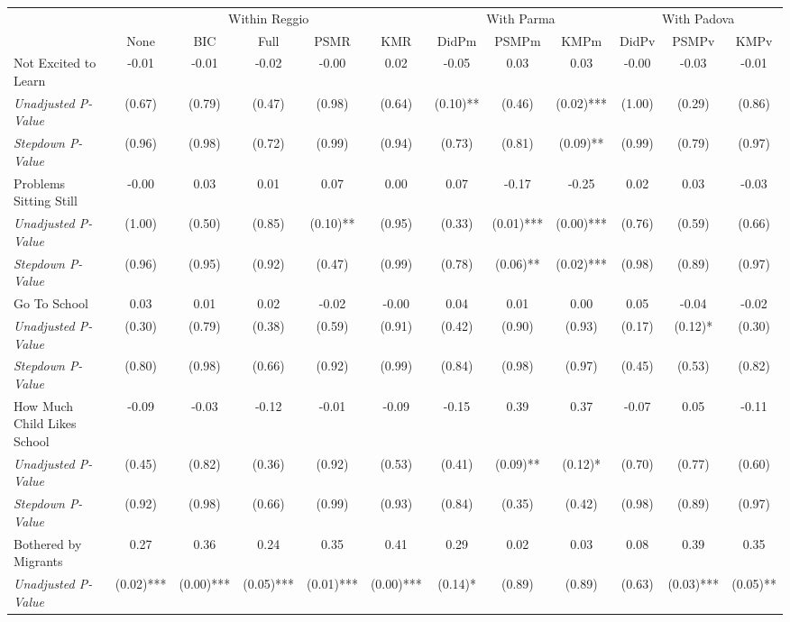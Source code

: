 \begin{tabular}{l c c c c c c c c c c c}
\toprule
& \multicolumn{5}{c}{Within Reggio} & \multicolumn{3}{c}{With Parma} & \multicolumn{3}{c}{With Padova} \\\cmidrule(lr){2-6} \cmidrule(lr){7-9} \cmidrule(lr){10-12}
 & None & BIC & Full & PSMR & KMR & DidPm & PSMPm & KMPm & DidPv & PSMPv & KMPv \\
\midrule
Not Excited to Learn & -0.01 & -0.01 & -0.02 & -0.00 & 0.02 & -0.05 & 0.03 & 0.03 & -0.00 & -0.03 & -0.01 \\
\quad \textit{Unadjusted P-Value} & (0.67) & (0.79) & (0.47) & (0.98) & (0.64) & (0.10)** & (0.46) & (0.02)*** & (1.00) & (0.29) & (0.86) \\
\quad \textit{Stepdown P-Value} & (0.96) & (0.98) & (0.72) & (0.99) & (0.94) & (0.73) & (0.81) & (0.09)** & (0.99) & (0.79) & (0.97) \\
Problems Sitting Still & -0.00 & 0.03 & 0.01 & 0.07 & 0.00 & 0.07 & -0.17 & -0.25 & 0.02 & 0.03 & -0.03 \\
\quad \textit{Unadjusted P-Value} & (1.00) & (0.50) & (0.85) & (0.10)** & (0.95) & (0.33) & (0.01)*** & (0.00)*** & (0.76) & (0.59) & (0.66) \\
\quad \textit{Stepdown P-Value} & (0.96) & (0.95) & (0.92) & (0.47) & (0.99) & (0.78) & (0.06)** & (0.02)*** & (0.98) & (0.89) & (0.97) \\
Go To School & 0.03 & 0.01 & 0.02 & -0.02 & -0.00 & 0.04 & 0.01 & 0.00 & 0.05 & -0.04 & -0.02 \\
\quad \textit{Unadjusted P-Value} & (0.30) & (0.79) & (0.38) & (0.59) & (0.91) & (0.42) & (0.90) & (0.93) & (0.17) & (0.12)* & (0.30) \\
\quad \textit{Stepdown P-Value} & (0.80) & (0.98) & (0.66) & (0.92) & (0.99) & (0.84) & (0.98) & (0.97) & (0.45) & (0.53) & (0.82) \\
How Much Child Likes School & -0.09 & -0.03 & -0.12 & -0.01 & -0.09 & -0.15 & 0.39 & 0.37 & -0.07 & 0.05 & -0.11 \\
\quad \textit{Unadjusted P-Value} & (0.45) & (0.82) & (0.36) & (0.92) & (0.53) & (0.41) & (0.09)** & (0.12)* & (0.70) & (0.77) & (0.60) \\
\quad \textit{Stepdown P-Value} & (0.92) & (0.98) & (0.66) & (0.99) & (0.93) & (0.84) & (0.35) & (0.42) & (0.98) & (0.89) & (0.97) \\
Bothered by Migrants & 0.27 & 0.36 & 0.24 & 0.35 & 0.41 & 0.29 & 0.02 & 0.03 & 0.08 & 0.39 & 0.35 \\
\quad \textit{Unadjusted P-Value} & (0.02)*** & (0.00)*** & (0.05)*** & (0.01)*** & (0.00)*** & (0.14)* & (0.89) & (0.89) & (0.63) & (0.03)*** & (0.05)** \\

\end{tabular}
